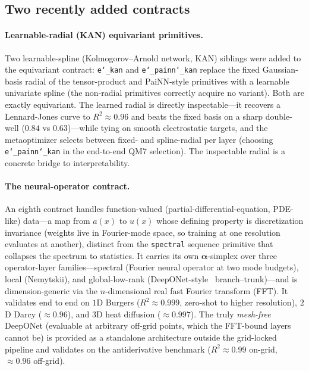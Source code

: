 \documentclass[11pt]{article}
\newcommand{\allowbreakhere}{\discretionary{}{}{}}
\newcommand{\code}[1]{\texttt{\def\_{\char`_\allowbreakhere}#1}}
\newcommand{\alphapar}{\bm{\alpha}}
\begin{document}
\subsection{Two recently added contracts}

\paragraph{Learnable-radial (KAN) equivariant primitives.} Two learnable-spline (Kolmogorov--Arnold network, KAN)
siblings were added to the equivariant contract: \code{e\_kan} and \code{e\_painn\_kan} replace the fixed
Gaussian-basis radial of the tensor-product and PaiNN-style primitives with a learnable univariate spline
(the non-radial primitives correctly acquire no variant). Both are exactly equivariant. The learned radial
is directly inspectable---it recovers a Lennard-Jones curve to $R^2\approx0.96$ and beats the fixed basis on
a sharp double-well ($0.84$ vs $0.63$)---while tying on smooth electrostatic targets, and the metaoptimizer
selects between fixed- and spline-radial per layer (choosing \code{e\_painn\_kan} in the end-to-end QM7
selection). The inspectable radial is a concrete bridge to interpretability.

\paragraph{The neural-operator contract.} An eighth contract handles function-valued (partial-differential-equation, PDE-like) data---a map
from $a(x)$ to $u(x)$ whose defining property is discretization invariance (weights live in Fourier-mode
space, so training at one resolution evaluates at another), distinct from the \code{spectral} sequence
primitive that collapses the spectrum to statistics. It carries its own $\alphapar$-simplex over three
operator-layer families---spectral (Fourier neural operator at two mode budgets), local (Nemytskii), and
global-low-rank (DeepONet-style~\cite{lu2021deeponet} branch--trunk)---and is dimension-generic via the $n$-dimensional real fast Fourier transform (FFT). It
validates end to end on $1$D Burgers ($R^2\approx0.999$, zero-shot to higher resolution), $2$D Darcy
($\approx0.96$), and $3$D heat diffusion ($\approx0.997$). The truly \emph{mesh-free} DeepONet (evaluable at
arbitrary off-grid points, which the FFT-bound layers cannot be) is provided as a standalone architecture
outside the grid-locked pipeline and validates on the antiderivative benchmark ($R^2\approx0.99$ on-grid,
$\approx0.96$ off-grid).
\end{document}
